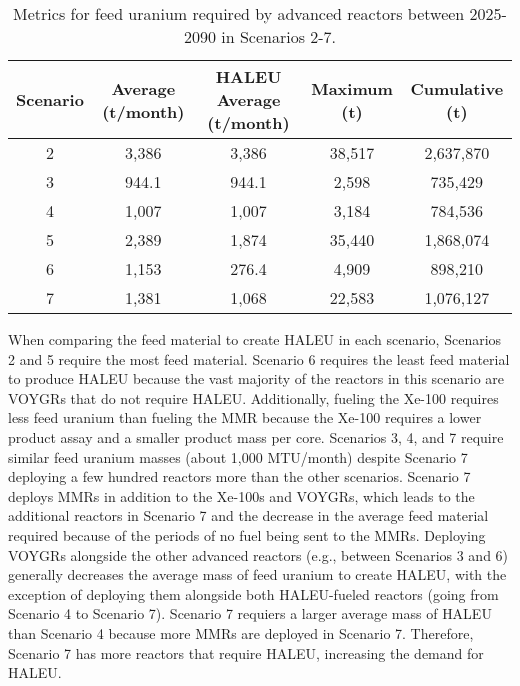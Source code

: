 \begin{table}
    \centering 
    \caption{Metrics for feed uranium required by advanced reactors 
    between 2025-2090 in Scenarios 2-7.}
    \label{tab:nogrowth_feed}
    \begin{tabular}{c c c c c}
        \hline
        Scenario & Average (t/month) & \gls{HALEU} Average 
        (t/month) & Maximum (t) & Cumulative (t)\\\hline
        2 & 3,386 & 3,386 & 38,517 & 2,637,870\\
        3 & 944.1 & 944.1 & 2,598 & 735,429\\
        4 & 1,007 & 1,007 & 3,184 & 784,536\\
        5 & 2,389 & 1,874 & 35,440 & 1,868,074\\
        6 & 1,153 & 276.4 & 4,909 & 898,210\\
        7 & 1,381 & 1,068 & 22,583 & 1,076,127\\
        \hline
    \end{tabular}
\end{table}

When comparing the feed material to create \gls{HALEU} in each scenario, 
Scenarios 2 and 5 require the most feed material. Scenario 6 
requires the least feed material to produce \gls{HALEU} because the vast 
majority of 
the reactors in this scenario are VOYGRs that do not require \gls{HALEU}.
Additionally, fueling the Xe-100 requires less feed uranium than fueling 
the \gls{MMR} because the Xe-100 requires a lower product assay and a 
smaller product mass per core. 
Scenarios 3, 4, and 7 require similar feed uranium masses (about 1,000 MTU/month)
despite Scenario 7 deploying a few hundred reactors more than the 
other scenarios. 
Scenario 7 deploys \glspl{MMR} in addition to the Xe-100s and VOYGRs,
which leads to the additional reactors in Scenario 7 and the decrease in 
the average feed material required because of the periods of no fuel being 
sent to the \glspl{MMR}. Deploying VOYGRs alongside the other advanced 
reactors (e.g., between Scenarios 3 and 6) generally decreases the average 
mass of feed uranium to create \gls{HALEU}, with the exception of deploying 
them alongside both \gls{HALEU}-fueled reactors (going from Scenario 4 to 
Scenario 7). Scenario 7 requiers a larger average mass of \gls{HALEU} than 
Scenario 4 because more \glspl{MMR} are deployed in Scenario 7. Therefore, 
Scenario 7 has more reactors that require \gls{HALEU}, increasing the 
demand for \gls{HALEU}.

